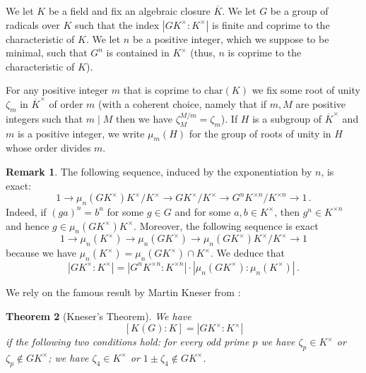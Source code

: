 \documentclass[11pt, a4paper]{amsart}
\newtheorem {thm}{Theorem}
\theoremstyle{definition}
\newtheorem {rem}[thm]{Remark}
\newcommand{\ch}{\mathrm{char}}
\begin{document}
We let $K$ be a field and fix an algebraic closure $\overline{K}$. We  let $G$ be a group of radicals over $K$ such that the index $|G K^\times :K^\times|$ is finite and coprime to the characteristic of $K$. We let $n$ be a positive integer, which we  suppose to be minimal, such that $G^n$ is contained in $K^\times$ (thus, $n$ is coprime to the characteristic of $K$). 

For any positive integer $m$ that is coprime to $\ch(K)$ we fix some root of unity $\zeta_m$ in $\overline{K}^\times$ of order $m$ (with a coherent choice, namely that if $m,M$ are positive integers such that $m\mid M$ then we have $\zeta_M^{M/m}=\zeta_m$). 
If $H$ is a subgroup of $\overline{K}^\times$ and $m$ is a positive integer, we write $\mu_m(H)$ for the group of roots of unity in $H$ whose order divides $m$.

\begin{rem}\label{remexact}
The following sequence, induced by the exponentiation by $n$, is exact:
\begin{equation}\label{exact}
1 \rightarrow \mu_n(GK^\times)K^\times/K^\times \rightarrow GK^\times/K^\times \rightarrow G^nK^{\times n}/K^{\times n} \rightarrow 1\,.
\end{equation}
Indeed, if $(ga)^n=b^n$ for some $g\in G$ and for some $a,b\in K^\times$, then $g^n\in K^{\times n}$ and hence $g\in \mu_n(GK^\times)K^\times$.
Moreover, the following sequence is exact 
\begin{equation*}\label{exactroot}
1 \rightarrow \mu_n(K^\times) \rightarrow \mu_n(GK^\times) \rightarrow \mu_n(GK^\times)K^\times/K^\times \rightarrow 1
\end{equation*}
because we have $\mu_n(K^\times)=\mu_n(GK^\times)\cap K^\times$.
We deduce that 
\begin{equation}\label{exactall}
|GK^\times:K^\times|=|G^nK^{\times n}:K^{\times n}|\cdot | \mu_n(GK^\times): \mu_n(K^\times)|\,.
\end{equation}
\end{rem}

We rely on the famous result by Martin Kneser from \cite{Kneser}:

\begin{thm}[Kneser's Theorem]\label{Kneserthm}
We have 
$$[K(G):K]=|GK^\times:K^\times|$$
if the following two conditions hold: for every odd prime $p$ we have $\zeta_p\in K^\times$ or $\zeta_p\notin GK^\times$; we have $\zeta_4\in K^\times$ or $1\pm \zeta_4\notin G K^\times$. 
\end{thm}
\end{document}
